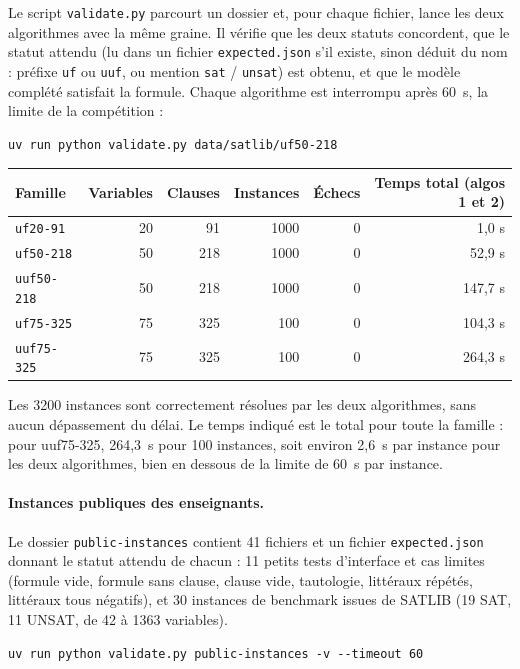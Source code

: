 \documentclass[11pt,a4paper]{article}
\begin{document}
Le script \texttt{validate.py} parcourt un dossier et, pour chaque fichier,
lance les deux algorithmes avec la même graine. Il vérifie que les deux
statuts concordent, que le statut attendu (lu dans un fichier
\texttt{expected.json} s'il existe, sinon déduit du nom : préfixe
\texttt{uf} ou \texttt{uuf}, ou mention \texttt{sat} / \texttt{unsat}) est
obtenu, et que le modèle complété satisfait la formule. Chaque algorithme
est interrompu après 60~s, la limite de la compétition :
\begin{lstlisting}
uv run python validate.py data/satlib/uf50-218
\end{lstlisting}

\begin{center}
\begin{tabular}{lrrrrr}
  Famille & Variables & Clauses & Instances & Échecs & Temps total (algos 1 et 2) \\
  \hline
  \texttt{uf20-91}   & 20 & 91  & 1000 & 0 & 1,0 s \\
  \texttt{uf50-218}  & 50 & 218 & 1000 & 0 & 52,9 s \\
  \texttt{uuf50-218} & 50 & 218 & 1000 & 0 & 147,7 s \\
  \texttt{uf75-325}  & 75 & 325 & 100  & 0 & 104,3 s \\
  \texttt{uuf75-325} & 75 & 325 & 100  & 0 & 264,3 s \\
\end{tabular}
\end{center}
Les 3200 instances sont correctement résolues par les deux algorithmes,
sans aucun dépassement du délai. Le temps indiqué est le total pour toute la
famille : pour uuf75-325, 264{,}3~s pour 100 instances, soit environ 2{,}6~s
par instance pour les deux algorithmes, bien en dessous de la limite de
60~s par instance.

\paragraph{Instances publiques des enseignants.} Le dossier
\texttt{public-instances} contient 41 fichiers et un fichier
\texttt{expected.json} donnant le statut attendu de chacun : 11 petits tests
d'interface et cas limites (formule vide, formule sans clause, clause vide,
tautologie, littéraux répétés, littéraux tous négatifs), et 30 instances de
benchmark issues de SATLIB (19 SAT, 11 UNSAT, de 42 à 1363 variables).
\begin{lstlisting}
uv run python validate.py public-instances -v --timeout 60
\end{lstlisting}
\end{document}
